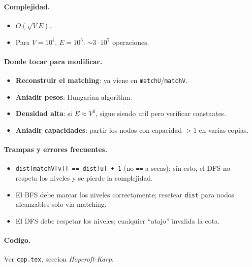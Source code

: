 \paragraph{Complejidad.}
\begin{itemize}\setlength\itemsep{0pt}
	\item $O(\sqrt{V} E)$.
	\item Para $V = 10^4$, $E = 10^5$: $\sim 3 \cdot 10^7$ operaciones.
\end{itemize}

\paragraph{Donde tocar para modificar.}
\begin{itemize}\setlength\itemsep{0pt}
	\item \textbf{Reconstruir el matching}: ya viene en \texttt{matchU}/\texttt{matchV}.
	\item \textbf{Aniadir pesos}: Hungarian algorithm.
	\item \textbf{Densidad alta}: si $E \approx V^2$, sigue siendo util pero verificar constantes.
	\item \textbf{Aniadir capacidades}: partir los nodos con capacidad $> 1$ en varias copias.
\end{itemize}

\paragraph{Trampas y errores frecuentes.}
\begin{itemize}\setlength\itemsep{0pt}
	\item \texttt{dist[matchV[v]] == dist[u] + 1} (no \texttt{==} a secas); sin esto, el DFS no respeta los niveles y se pierde la complejidad.
	\item El BFS debe marcar los niveles correctamente; resetear \texttt{dist} para nodos alcanzables solo via matching.
	\item El DFS debe respetar los niveles; cualquier ``atajo'' invalida la cota.
\end{itemize}

\paragraph{Codigo.}
Ver \texttt{cpp.tex}, seccion \textit{Hopcroft-Karp}.
